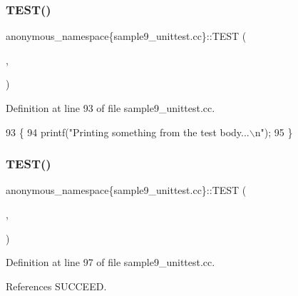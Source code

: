 \subsubsection{\texorpdfstring{T\+E\+S\+T()}{TEST()}\hspace{0.1cm}{\footnotesize\ttfamily [1/3]}}
{\footnotesize\ttfamily anonymous\+\_\+namespace\{sample9\+\_\+unittest.\+cc\}\+::T\+E\+ST (\begin{DoxyParamCaption}\item[{Custom\+Output\+Test}]{,  }\item[{Prints\+Message}]{ }\end{DoxyParamCaption})}



Definition at line 93 of file sample9\+\_\+unittest.\+cc.


\begin{DoxyCode}
93                                       \{
94   printf(\textcolor{stringliteral}{"Printing something from the test body...\(\backslash\)n"});
95 \}
\end{DoxyCode}
\mbox{\label{namespaceanonymous__namespace_02sample9__unittest_8cc_03_aa945da85de673d799587ce52ce590af2}} 
\subsubsection{\texorpdfstring{T\+E\+S\+T()}{TEST()}\hspace{0.1cm}{\footnotesize\ttfamily [2/3]}}
{\footnotesize\ttfamily anonymous\+\_\+namespace\{sample9\+\_\+unittest.\+cc\}\+::T\+E\+ST (\begin{DoxyParamCaption}\item[{Custom\+Output\+Test}]{,  }\item[{Succeeds}]{ }\end{DoxyParamCaption})}



Definition at line 97 of file sample9\+\_\+unittest.\+cc.



References S\+U\+C\+C\+E\+ED.


